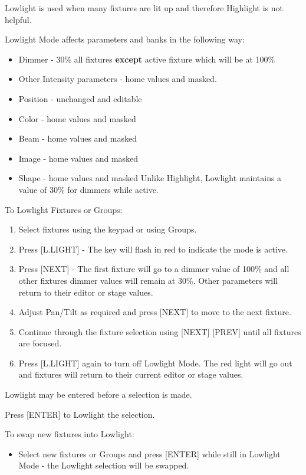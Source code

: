 \documentclass[
]{article}
\providecommand{\tightlist}{%
  \setlength{\itemsep}{0pt}\setlength{\parskip}{0pt}}
\begin{document}
Lowlight is used when many fixtures are lit up and therefore Highlight is not helpful.

Lowlight Mode affects parameters and banks in the following way:

\begin{itemize}
\item
  Dimmer - 30\% all fixtures \textbf{except} active fixture which will be at 100\%
\item
  Other Intensity parameters - home values and masked.
\item
  Position - unchanged and editable
\item
  Color - home values and masked
\item
  Beam - home values and masked
\item
  Image - home values and masked
\item
  Shape - home values and masked Unlike Highlight, Lowlight maintains a value of 30\% for dimmers while active.
\end{itemize}

To Lowlight Fixtures or Groups:

\begin{enumerate}
\def\labelenumi{\arabic{enumi}.}
\item
  Select fixtures using the keypad or using Groups.
\item
  Press {[}L.LIGHT{]} - The key will flash in {red} to indicate the mode is active.
\item
  Press {[}NEXT{]} - The first fixture will go to a dimmer value of 100\% and all other fixtures dimmer values will remain at 30\%. Other parameters will return to their editor or stage values.
\item
  Adjust Pan/Tilt as required and press {[}NEXT{]} to move to the next fixture.
\item
  Continue through the fixture selection using {[}NEXT{]} {[}PREV{]} until all fixtures are focused.
\item
  Press {[}L.LIGHT{]} again to turn off Lowlight Mode. The red light will go out and fixtures will return to their current editor or stage values.
\end{enumerate}

Lowlight may be entered before a selection is made.

Press {[}ENTER{]} to Lowlight the selection.

To swap new fixtures into Lowlight:

\begin{itemize}
\tightlist
\item
  Select new fixtures or Groups and press {[}ENTER{]} while still in Lowlight Mode - the Lowlight selection will be swapped.
\end{itemize}
\end{document}
